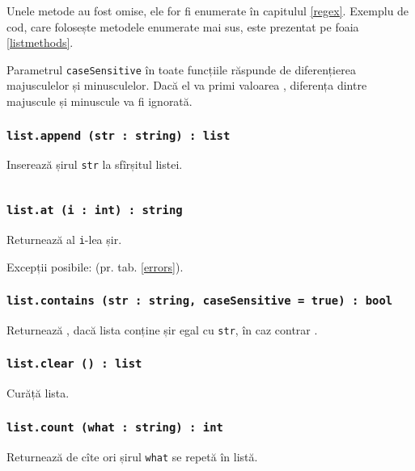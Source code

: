 Unele metode au fost omise, ele for fi enumerate în capitulul \ref{regex}. Exemplu de cod, care folosește metodele enumerate mai sus, este prezentat pe foaia \ref{listmethods}. 

Parametrul \texttt{caseSensitive} în toate funcțiile răspunde de diferențierea majusculelor și minusculelor. Dacă el va primi valoarea \false, diferența dintre majuscule și minuscule va fi ignorată.

\subsubsection{\texttt{list.append (str : string) : list}}

Inserează șirul \texttt{str} la sfîrșitul listei.

\newpage
\begin{sourcecode}
    \label{listmethods}
    \inputminted[linenos]{icl}{../sources/listmethods.icL}
\end{sourcecode}

\subsubsection{\texttt{list.at (i : int) : string}}

Returnează al \texttt{i}-lea șir.

Excepții posibile:  (pr. tab. \ref{errors}).

\subsubsection{\texttt{list.contains (str : string, caseSensitive = true) : bool}}

Returnează \true, dacă lista conține șir egal cu \texttt{str}, în caz contrar \false.

\subsubsection{\texttt{list.clear () : list}}

Curăță lista.

\subsubsection{\texttt{list.count (what : string) : int}}

Returnează de cîte ori șirul \texttt{what} se repetă în listă.

